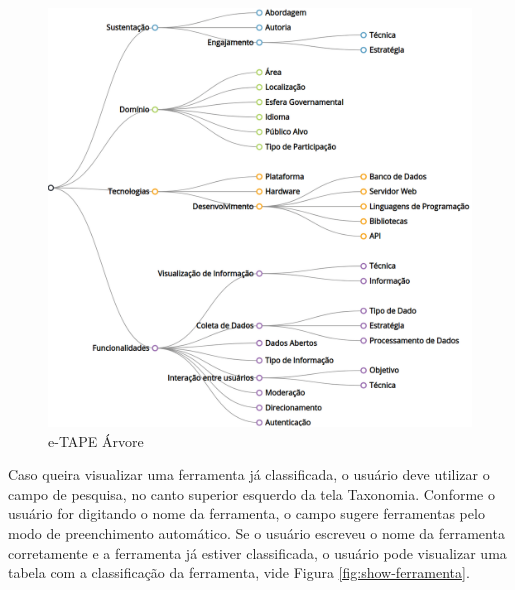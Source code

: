 \vspace{1cm}

\begin{figure}[!ht]
    \centering
    \includegraphics[scale=0.20]{./figuras/taxonopart-horizontal.png}
    \caption{e-TAPE Árvore}
    \label{fig:e-tapeArvore}
\end{figure}
\newpage

\par
Caso queira visualizar uma ferramenta já classificada, o usuário deve utilizar o campo de pesquisa, no canto superior esquerdo da tela Taxonomia.
Conforme o usuário for digitando o nome da ferramenta, o campo sugere ferramentas pelo modo de preenchimento automático. Se o usuário escreveu o nome da ferramenta corretamente 
e a ferramenta já estiver classificada, o usuário pode visualizar uma tabela com a classificação da 
ferramenta, vide Figura \ref{fig:show-ferramenta}.

\vspace{0.5cm}

